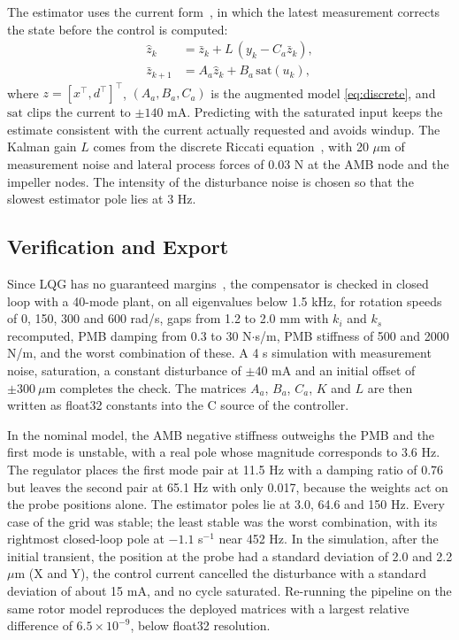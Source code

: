 \documentclass[conference]{IEEEtran}
\begin{document}
The estimator uses the current form~\cite{franklin1998digital}, in which the latest measurement corrects the state before the control is computed:
\begin{equation}
\begin{aligned}
\hat{z}_k &= \bar{z}_k + L\,(y_k - C_a \bar{z}_k),\\
\bar{z}_{k+1} &= A_a \hat{z}_k + B_a\, \mathrm{sat}(u_k),
\end{aligned} \label{eq:estimator}
\end{equation}
where $z = [x^\top, d^\top]^\top$, $(A_a, B_a, C_a)$ is the augmented model \eqref{eq:discrete}, and $\mathrm{sat}$ clips the current to $\pm 140$ mA. Predicting with the saturated input keeps the estimate consistent with the current actually requested and avoids windup. The Kalman gain $L$ comes from the discrete Riccati equation~\cite{kalman1960new,virtanen2020scipy}, with 20 $\mu$m of measurement noise and lateral process forces of 0.03 N at the AMB node and the impeller nodes. The intensity of the disturbance noise is chosen so that the slowest estimator pole lies at 3 Hz.

\subsection{Verification and Export}

Since LQG has no guaranteed margins~\cite{doyle1978guaranteed}, the compensator is checked in closed loop with a 40-mode plant, on all eigenvalues below 1.5 kHz, for rotation speeds of 0, 150, 300 and 600 rad/s, gaps from 1.2 to 2.0 mm with $k_i$ and $k_s$ recomputed, PMB damping from 0.3 to 30 N$\cdot$s/m, PMB stiffness of 500 and 2000 N/m, and the worst combination of these. A 4 s simulation with measurement noise, saturation, a constant disturbance of $\pm 40$ mA and an initial offset of $\pm 300~\mu$m completes the check. The matrices $A_a$, $B_a$, $C_a$, $K$ and $L$ are then written as float32 constants into the C source of the controller.

In the nominal model, the AMB negative stiffness outweighs the PMB and the first mode is unstable, with a real pole whose magnitude corresponds to 3.6 Hz. The regulator places the first mode pair at 11.5 Hz with a damping ratio of 0.76 but leaves the second pair at 65.1 Hz with only 0.017, because the weights act on the probe positions alone. The estimator poles lie at 3.0, 64.6 and 150 Hz. Every case of the grid was stable; the least stable was the worst combination, with its rightmost closed-loop pole at $-1.1$ s$^{-1}$ near 452 Hz. In the simulation, after the initial transient, the position at the probe had a standard deviation of 2.0 and 2.2 $\mu$m (X and Y), the control current cancelled the disturbance with a standard deviation of about 15 mA, and no cycle saturated. Re-running the pipeline on the same rotor model reproduces the deployed matrices with a largest relative difference of $6.5\times 10^{-9}$, below float32 resolution.
\end{document}
